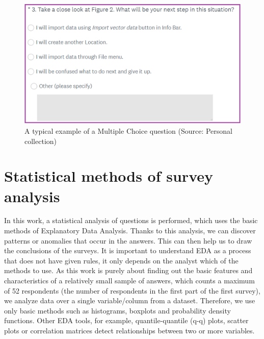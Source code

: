 \documentclass[a4paper,10pt,twoside]{article}
\begin{document}
\vspace{0.3cm}
\begin{figure}[hbt!] 
\begin{center}
\includegraphics[width=14cm]{../pictures/multiple_choice_question.png} 
\caption[A typical example of a Multiple Choice question]{A typical example of a Multiple Choice question (Source: Personal collection)}
\label{fig:multiple_choice_question}
\end{center}
\end{figure}

\newpage
\vspace*{-1cm}
\section{Statistical methods of survey analysis}
\label{sec:qstat}

\noindent In this work, a statistical analysis of questions is performed, which uses the basic methods of Explanatory Data Analysis. Thanks to this analysis, we can discover patterns or anomalies that occur in the answers. This can then help us to draw the conclusions of the surveys. It is important to understand EDA as a process that does not have given rules, it only depends on the analyst which of the methods to use. As this work is purely about finding out the basic features and characteristics of a relatively small sample of answers, which counts a maximum of 52 respondents (the number of respondents in the first part of the first survey), we analyze data over a single variable/column from a dataset. Therefore, we use only basic methods such as histograms, boxplots and probability density functions. Other EDA tools, for example, quantile-quantile (q-q) plots, scatter plots or correlation matrices detect relationships between two or more variables.
\end{document}
